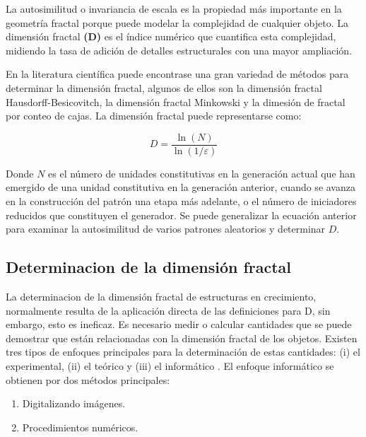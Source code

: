 \documentclass[11pt]{article}
\begin{document}
La autosimilitud o invariancia de escala es la propiedad m\'{a}s importante en la geometr\'{i}a fractal porque puede modelar la complejidad de cualquier objeto. La dimensi\'{o}n fractal \textbf{(D)} es el \'{i}ndice num\'{e}rico que cuantifica esta complejidad, midiendo la tasa de adici\'{o}n de detalles estructurales con una mayor ampliaci\'{o}n.

En la literatura cient\'{i}fica puede encontrase una gran variedad de m\'{e}todos para determinar la dimensi\'{o}n fractal, algunos de ellos son la dimensi\'{o}n fractal Hausdorff-Besicovitch, la dimensi\'{o}n fractal Minkowski y la dimesi\'{o}n de fractal por conteo de cajas. La dimensi\'{o}n fractal puede representarse como:

\begin{equation}
 D = \frac{\ln(N)}{\ln(1/\varepsilon)}
\end{equation}

Donde \(N\) es el n\'{u}mero de unidades constitutivas en la generaci\'{o}n actual que han emergido de una unidad constitutiva en la generaci\'{o}n anterior, cuando se avanza en la construcci\'{o}n del patr\'{o}n una etapa m\'{a}s adelante, o el n\'{u}mero de iniciadores reducidos que constituyen el generador. Se puede generalizar la ecuaci\'{o}n anterior para examinar la autosimilitud de varios patrones aleatorios y determinar \(D\).
 
\subsection{Determinacion de la dimensi\'{o}n fractal}
\label{subsec:subseccion2.2}


La determinacion de la dimensi\'{o}n fractal de estructuras en crecimiento, normalmente resulta de la aplicaci\'{o}n directa de las definiciones para D, sin embargo, esto es ineficaz. Es necesario medir o calcular cantidades que se puede demostrar que est\'{a}n relacionadas con la dimensi\'{o}n fractal de los objetos. Existen  tres tipos de enfoques principales para la determinaci\'{o}n de estas cantidades: (i) el experimental, (ii) el te\'{o}rico y (iii) el inform\'{a}tico \cite{Vicsek1992}. El enfoque inform\'{a}tico se obtienen por dos m\'{e}todos principales: 


\begin{enumerate}
\item Digitalizando im\'{a}genes.
\item Procedimientos num\'{e}ricos.
\end{enumerate}
 
\end{document}
